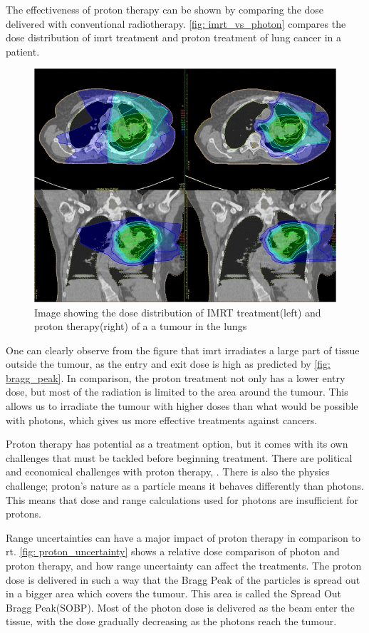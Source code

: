 \documentclass[main.tex]{subfiles}
\begin{document}
The effectiveness of proton therapy can be shown by comparing the dose delivered with conventional radiotherapy. \autoref{fig: imrt_vs_photon} compares the dose distribution of \gls{imrt} treatment and proton treatment of lung cancer in a patient.

\begin{figure}[!htpb]
    \centering
    \includegraphics[width=12cm ]{images/proton_vs_imrt.png}
    \caption{Image showing the dose distribution of IMRT treatment(left) and proton therapy(right) of a a tumour in the lungs\cite{protonimage}}
    \label{fig: imrt_vs_photon}
\end{figure}
\FloatBarrier

One can clearly observe from the figure that \gls{imrt} irradiates a large part of tissue outside the tumour, as the entry and exit dose is high as predicted by \autoref{fig: bragg_peak}. In comparison, the proton treatment not only has a lower entry dose, but most of the radiation is limited to the area around the tumour. This allows us to irradiate the tumour with higher doses than what would be possible with photons, which gives us more effective treatments against cancers.

Proton therapy has potential as a treatment option, but it comes with its own challenges that must be tackled before beginning treatment. There are political and economical challenges with proton therapy,   . There is also the physics challenge; proton's nature as a particle means it behaves differently than photons. This means that dose and range calculations used for photons are insufficient for protons.\cite{proton_challenges}

Range uncertainties can have a major impact of proton therapy in comparison to \gls{rt}. \autoref{fig: proton_uncertainty} shows a relative dose comparison of photon and proton therapy, and how range uncertainty can affect the treatments. The proton dose is delivered in such a way that the Bragg Peak of the particles is spread out in a bigger area which covers the tumour. This area is called the Spread Out Bragg Peak(SOBP). Most of the photon dose is delivered as the beam enter the tissue, with the dose gradually decreasing as the photons reach the tumour.
\end{document}
